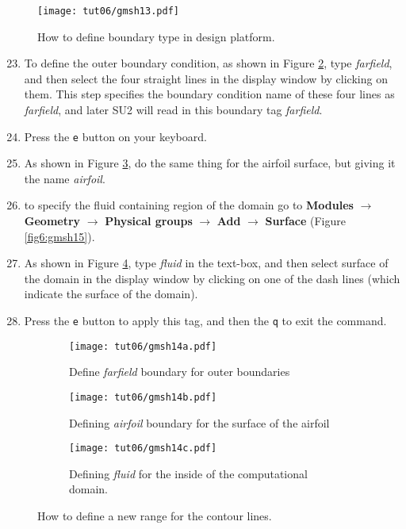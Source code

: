\begin{figure}[ht]
    \centering
    \texttt{[image: tut06/gmsh13.pdf]}
    \caption{How to define boundary type in design platform.}
    \label{fig6:gmsh13}
\end{figure}
\begin{enumerate}[label=\arabic*)]
	\setcounter{enumi}{22}
	\item To define the outer boundary condition, as shown in Figure \ref{fig6:gmsh14 a}, type \textit{farfield}, and then select the four straight lines in the display window by clicking on them. This step specifies the boundary condition name of these four lines as \textit{farfield}, and later SU2 will read in this boundary tag \textit{farfield}.
	\item Press the \texttt{e} button on your keyboard. 
	\item As shown in Figure \ref{fig6:gmsh14 b}, do the same thing for the airfoil surface, but giving it the name \textit{airfoil}.
	\item to specify the fluid containing region of the domain go to \textbf{Modules} $\rightarrow$ \textbf{Geometry} $\rightarrow$ \textbf{Physical groups} $\rightarrow$ \textbf{Add} $\rightarrow$ \textbf{Surface} (Figure \ref{fig6:gmsh15}).
	\item As shown in Figure \ref{fig6:gmsh14 c}, type \textit{fluid} in the text-box, and then select surface of the domain in the display window by clicking on one of the dash lines (which indicate the surface of the domain).
	\item Press the \texttt{e} button to apply this tag, and then the \texttt{q} to exit the command.
\end{enumerate}
\begin{figure}[ht]
    \centering
     \begin{subfigure}[b]{.4\textwidth}
         \centering
         \texttt{[image: tut06/gmsh14a.pdf]}
         \caption{Define \textit{farfield} boundary for outer boundaries}
         \label{fig6:gmsh14 a}
     \end{subfigure}
     \hfill
     \begin{subfigure}[b]{.4\textwidth}
         \centering
         \texttt{[image: tut06/gmsh14b.pdf]}
         \caption{Defining \textit{airfoil} boundary for the surface of the airfoil}
         \label{fig6:gmsh14 b}
     \end{subfigure}  
     \hfill
     \begin{subfigure}[b]{.4\textwidth}
         \centering
         \texttt{[image: tut06/gmsh14c.pdf]}
         \caption{Defining \textit{fluid} for the inside of the computational domain.}
         \label{fig6:gmsh14 c}
     \end{subfigure} 
    \caption{How to define a new range for the contour lines.}
    \label{fig6:gmsh14}
\end{figure}
